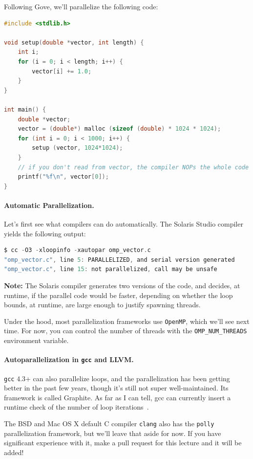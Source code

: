 \documentclass[a4paper]{report}
\begin{document}
Following Gove, we'll parallelize the following code:
\begin{lstlisting}[language=C]
#include <stdlib.h>

void setup(double *vector, int length) {
    int i;
    for (i = 0; i < length; i++) {
        vector[i] += 1.0;
    }
}

int main() {
    double *vector;
    vector = (double*) malloc (sizeof (double) * 1024 * 1024);
    for (int i = 0; i < 1000; i++) {
        setup (vector, 1024*1024);
    }
    // if you don't read from vector, the compiler NOPs the whole code
    printf("%f\n", vector[0]);
}
\end{lstlisting}


\paragraph{Automatic Parallelization.} Let's first see what compilers can do automatically.
The Solaris Studio compiler yields the following output:
{\small 
\begin{lstlisting}[language=C]
$ cc -O3 -xloopinfo -xautopar omp_vector.c 
"omp_vector.c", line 5: PARALLELIZED, and serial version generated
"omp_vector.c", line 15: not parallelized, call may be unsafe
\end{lstlisting}
} 

{\bf Note:} The Solaris compiler generates two versions of the code,
and decides, at runtime, if the parallel code would be faster, depending on
whether the loop bounds, at runtime, are large enough to justify spawning
threads.

Under the hood, most parallelization frameworks use {\tt OpenMP},
which we'll see next time. For now, you can control the number of
threads with the {\tt OMP\_NUM\_THREADS} environment variable.

\paragraph{Autoparallelization in {\tt gcc} and LLVM.}
{\tt gcc} 4.3+ can also parallelize loops, and the parallelization has
been getting better in the past few years, though it's still not super
well-maintained. Its framework is called Graphite. As far as I can
tell, gcc can currently insert a runtime check of the number of loop
iterations~\cite{autopar}.

The BSD and Mac OS X default C compiler {\tt clang} also has the {\tt polly} parallelization framework, but we'll leave that aside for now. If you have significant experience with it, make a pull request for this lecture and it will be added!
\end{document}
